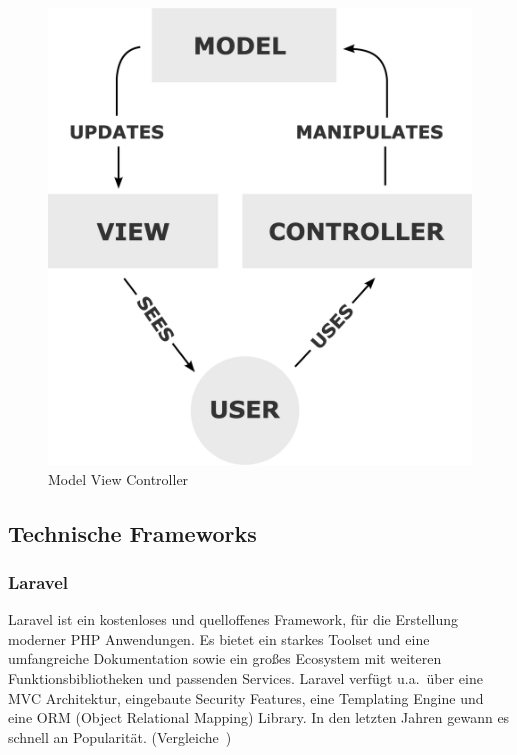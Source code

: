 \begin{figure}[h!]
    \centering
    \caption{Model View Controller}
    \label{fig:mvc}
    \includegraphics[scale=0.15]{assets/wikipedia_mvc_process}
\end{figure}

\newpage

\subsection{Technische Frameworks}

\subsubsection{Laravel}
Laravel ist ein kostenloses und quelloffenes Framework, für die Erstellung moderner PHP Anwendungen.
Es bietet ein starkes Toolset und eine umfangreiche Dokumentation sowie ein großes Ecosystem mit weiteren Funktionsbibliotheken und passenden Services.
Laravel verfügt u.a.\ über eine MVC Architektur, eingebaute Security Features, eine Templating Engine und eine ORM (Object Relational Mapping) Library.
In den letzten Jahren gewann es schnell an Popularität.
(Vergleiche~\cite{what-is-laravel})

